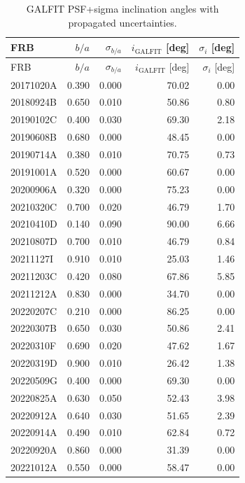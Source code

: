 \begin{longtable}{lrrrr}
\caption{GALFIT PSF+sigma inclination angles with propagated uncertainties.}\label{tab:galfit_inclinations} \\
\hline
 FRB & $b/a$ & $\sigma_{b/a}$ & $i_{\mathrm{GALFIT}}$ [deg] & $\sigma_i$ [deg] \\
\hline
\endfirsthead
\hline
 FRB & $b/a$ & $\sigma_{b/a}$ & $i_{\mathrm{GALFIT}}$ [deg] & $\sigma_i$ [deg] \\
\hline
\endhead
 20171020A & 0.390 & 0.000 & 70.02 & 0.00 \\
 20180924B & 0.650 & 0.010 & 50.86 & 0.80 \\
 20190102C & 0.400 & 0.030 & 69.30 & 2.18 \\
 20190608B & 0.680 & 0.000 & 48.45 & 0.00 \\
 20190714A & 0.380 & 0.010 & 70.75 & 0.73 \\
 20191001A & 0.520 & 0.000 & 60.67 & 0.00 \\
 20200906A & 0.320 & 0.000 & 75.23 & 0.00 \\
 20210320C & 0.700 & 0.020 & 46.79 & 1.70 \\
 20210410D & 0.140 & 0.090 & 90.00 & 6.66 \\
 20210807D & 0.700 & 0.010 & 46.79 & 0.84 \\
 20211127I & 0.910 & 0.010 & 25.03 & 1.46 \\
 20211203C & 0.420 & 0.080 & 67.86 & 5.85 \\
 20211212A & 0.830 & 0.000 & 34.70 & 0.00 \\
 20220207C & 0.210 & 0.000 & 86.25 & 0.00 \\
 20220307B & 0.650 & 0.030 & 50.86 & 2.41 \\
 20220310F & 0.690 & 0.020 & 47.62 & 1.67 \\
 20220319D & 0.900 & 0.010 & 26.42 & 1.38 \\
 20220509G & 0.400 & 0.000 & 69.30 & 0.00 \\
 20220825A & 0.630 & 0.050 & 52.43 & 3.98 \\
 20220912A & 0.640 & 0.030 & 51.65 & 2.39 \\
 20220914A & 0.490 & 0.010 & 62.84 & 0.72 \\
 20220920A & 0.860 & 0.000 & 31.39 & 0.00 \\
 20221012A & 0.550 & 0.000 & 58.47 & 0.00 \\
\hline
\end{longtable}